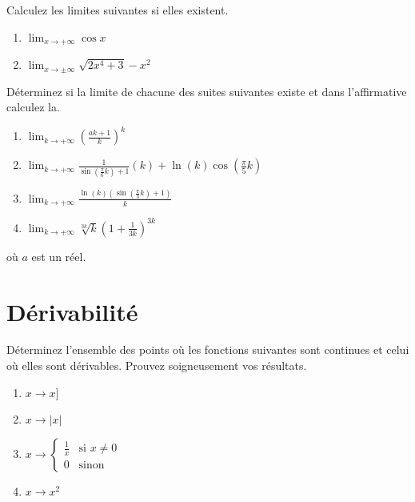 \exerNico Calculez  les limites suivantes si elles existent.
\begin{enumerate}
\item $  \lim_{x \rightarrow  +\infty} \cos x $
\item $  \lim_{x \rightarrow  \pm \infty }\sqrt{2x^4+3}-x^2 $

\end{enumerate}

\exerNico Déterminez si la limite de chacune des suites suivantes
existe et dans l'affirmative calculez la.
\begin{enumerate}
\item $  \lim_{k \rightarrow  +\infty }(\frac{a k +1}{k})^k $
\item $  \lim_{k \rightarrow  +\infty}\frac{1}{\sin(\frac{\pi}{6}k)+1}(k) + \ln(k)\cos(\frac{\pi}{5}k)$
\item $  \lim_{k \rightarrow  +\infty} \frac{\ln(k)(\sin(\frac{\pi}{3}k) +1)}{k} $
\item $  \lim_{k \rightarrow  +\infty } \sqrt[3k]{k} (1 +
\frac{1}{3k})^{3k} $
\end{enumerate}
où $a$ est un réel. 

\section{Dérivabilité}



\exerNico Déterminez l'ensemble des points où les fonctions suivantes
sont continues et celui où elles sont dérivables. Prouvez soigneusement
vos résultats.
\begin{enumerate}
\item $ x \rightarrow x]$
\item $ x \rightarrow |x| $
\item $ x \rightarrow
	\left\{ \begin{array}{ll}
	\frac{1}{x} & \mbox{si } x \not= 0 \\
	0 & \mbox{sinon}
	\end{array} \right. $
\item $ x \rightarrow x^2  $
\end{enumerate}




